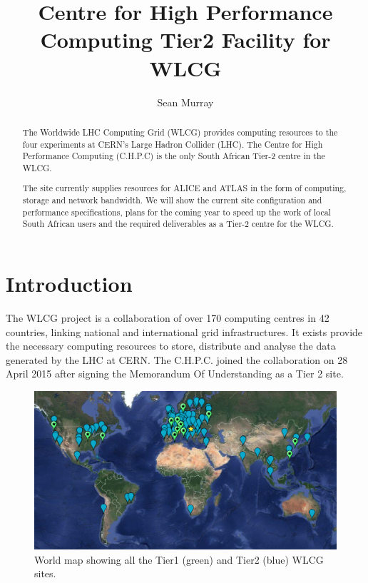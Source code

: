 \documentclass[a4paper]{jpconf}
\begin{document}
\title{Centre for High Performance Computing Tier2 Facility for WLCG}

\author{Sean Murray}

\address{Center for High Performance Computing\\ CSIR. \\Rosebank \\Cape Town\\7700}


\begin{abstract}

The Worldwide LHC Computing Grid (WLCG) provides computing resources to the four experiments at CERN’s Large Hadron Collider (LHC).  The Centre for High Performance Computing (C.H.P.C) is the only South African Tier-2 centre in the WLCG.

The site currently supplies resources for ALICE and ATLAS in the form of computing, storage and network bandwidth. We will show the current site configuration and performance specifications, plans for the coming year to speed up the work of local South African users and the required deliverables as a Tier-2 centre for the WLCG.
\end{abstract}

\section{Introduction}

The WLCG project is a collaboration of over 170 computing centres in 42 countries, linking national and international grid infrastructures.
It exists provide the necessary computing resources to store, distribute and analyse the data generated by the LHC at CERN.\cite{http://wlcg.web.cern.ch/}
The C.H.P.C. joined the collaboration on 28 April 2015 after signing the Memorandum Of Understanding as a Tier 2 site. 
\begin{figure}[h]
    \includegraphics[width=38pc]{WLCG-Sites.eps}
    \caption{\label{label} World map showing all the Tier1 (green) and Tier2 (blue) WLCG sites.}
\end{figure}
\end{document}
